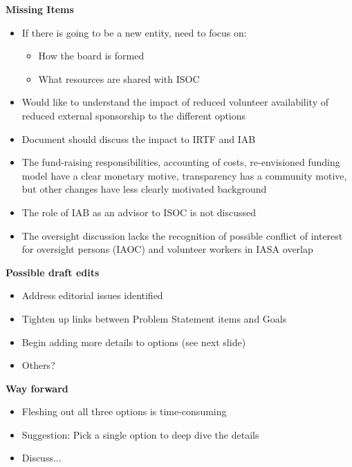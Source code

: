 \documentclass[helvetica]{seminar}
\newcommand{\heading}[1]{%
  \begin{center} 
    \large\bf 
    #1 
  \end{center} 
  \vspace{.4 in}}
\begin{document}
\begin{slide}
\heading{Missing Items}
{\footnotesize
\begin{itemize}
\item If there is going to be a new entity, need to focus on:
\begin{itemize}
\item How the board is formed
\item What resources are shared with ISOC
\end{itemize}

\item Would like to understand the impact of reduced volunteer availability of reduced external sponsorship to the different options
\item Document should discuss the impact to IRTF and IAB
\item The fund-raising responsibilities, accounting of costs, re-envisioned funding model have a clear monetary motive, transparency has a community motive, but other changes have less clearly motivated background
\item The role of IAB as an advisor to ISOC is not discussed
\item The oversight discussion lacks the recognition of possible conflict of interest for oversight persons (IAOC) and volunteer workers in IASA overlap
\end{itemize}
}
\end{slide}

\begin{slide}

\heading{Possible draft edits}
\begin{itemize}
\item Address editorial issues identified
\item Tighten up links between Problem Statement items and Goals
\item Begin adding more details to options (see next slide)
\item Others?
\end{itemize}
\end{slide}

\begin{slide}

\heading{Way forward}

\begin{itemize}
\item Fleshing out all three options is time-consuming
\item Suggestion: Pick a single option to deep dive the details
\item Discuss...
\end{itemize}

\end{slide}
\end{document}
